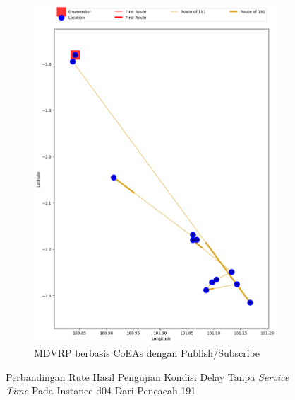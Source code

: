 \begin{figure}[H]\ContinuedFloat
	\centering
	\begin{subfigure}[t]{\textwidth}
		\centering
		\includegraphics[width=\textwidth]{Resources/Images/delayed_4/real_m15_n100_delayed_4_191_pubsub_coes}
		\caption{MDVRP berbasis CoEAs dengan Publish/Subscribe}
		\label{fig:real_m15_n100_delayed_4_191_pubsub_coes}
	\end{subfigure}
	\caption{Perbandingan Rute Hasil Pengujian Kondisi Delay Tanpa \textit{Service Time} Pada Instance d04 Dari Pencacah 191}
	\label{fig:real_m15_n100_delayed_4_191_contd}
\end{figure}


